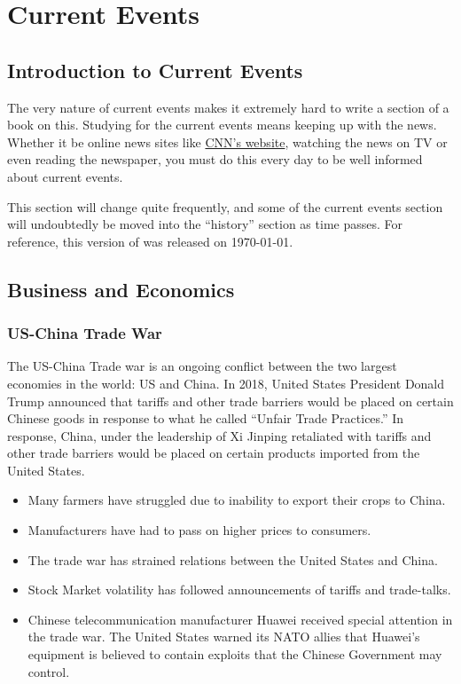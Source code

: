 \chapter{Current Events}

	\section{Introduction to Current Events}
		The very nature of current events makes it extremely hard to write a section of a book on this.  Studying for the current events means keeping up with the news.  Whether it be online news sites like \href{http://www.cnn.com}{CNN's website}, watching the news on TV or even reading the newspaper, you must do this every day to be well informed about current events.  
		
		This section will change quite frequently, and some of the current events section will undoubtedly be moved into the ``history'' section as time passes.  For reference, this version of \mytitle was released on \today. 
				
	\section{Business and Economics}
		\subsection{US-China Trade War}
		The US-China Trade war is an ongoing conflict between the two largest economies in the world: US and China.  In 2018, United States President Donald Trump announced that tariffs and other trade barriers would be placed on certain Chinese goods in response to what he called ``Unfair Trade Practices.''  In response, China, under the leadership of Xi Jinping retaliated with tariffs and other trade barriers would be placed on certain products imported from the United States.  
		
		\begin{itemize}
			\item Many farmers have struggled due to inability to export their crops to China.
			\item Manufacturers have had to pass on higher prices to consumers. 
			\item The trade war has strained relations between the United States and China.
			\item Stock Market volatility has followed announcements of tariffs and trade-talks.  
			\item Chinese telecommunication manufacturer Huawei received special attention in the trade war.  The United States warned its NATO allies that Huawei's equipment is believed to contain exploits that the Chinese Government may control.  

			
		\end{itemize}
